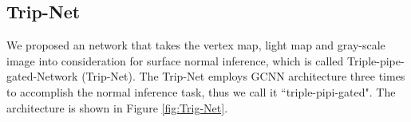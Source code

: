%
%
%


\subsection{Trip-Net}
We proposed an network that takes the vertex map, light map and gray-scale image into consideration for surface normal inference, which is called Triple-pipe-gated-Network (Trip-Net). 
The Trip-Net employs GCNN architecture three times to accomplish the normal inference task, thus we call it ``triple-pipi-gated". The architecture is shown in Figure \ref{fig:Trig-Net}.

